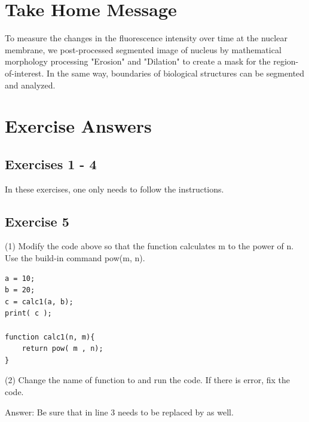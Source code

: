 \section{Take Home Message}


To measure the changes in the fluorescence intensity over time at the nuclear membrane, we post-processed segmented image of nucleus by mathematical morphology processing "Erosion" and "Dilation" to create a mask for the region-of-interest. In the same way, boundaries of biological structures can be segmented and analyzed.  



\section{Exercise Answers}

\subsection{Exercises 1 - 4} 

In these exercises, one only needs to follow the instructions. 

\subsection{Exercise 5}

(1) Modify the code above so that the function  calculates m to the power of n. Use the build-in command pow(m, n). 

\begin{lstlisting}
a = 10;
b = 20;
c = calc1(a, b);
print( c );

function calc1(n, m){
	return pow( m , n);
}
\end{lstlisting}

(2)  Change the name of function to  and run the code. If there is error, fix the code. 

Answer: Be sure that in line 3 needs to be replaced by  as well. 

